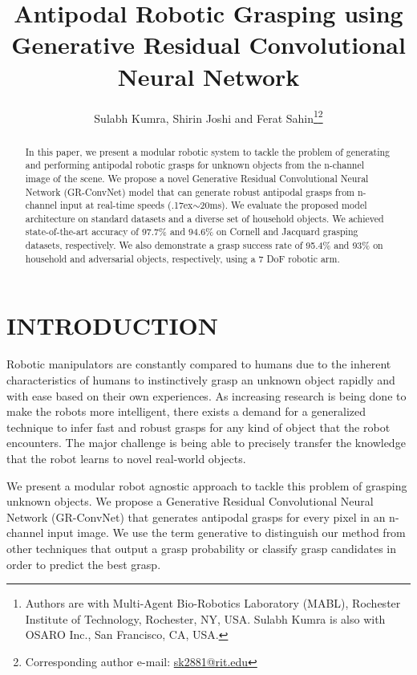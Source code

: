 \documentclass[letterpaper, 10pt, conference]{IEEEtran}
\begin{document}
\title{\LARGE \bf
Antipodal Robotic Grasping using \\ Generative Residual Convolutional Neural Network
}

\author{Sulabh Kumra, Shirin Joshi and Ferat Sahin\thanks{Authors are with Multi-Agent Bio-Robotics Laboratory (MABL), Rochester Institute of Technology, Rochester, NY, USA. Sulabh Kumra is also with OSARO Inc., San Francisco, CA, USA.}\thanks{Corresponding author e-mail: \href{mailto:sk2881@rit.edu}{sk2881@rit.edu}}
}

\maketitle



\begin{abstract}
In this paper, we present a modular robotic system to tackle the problem of generating and performing antipodal robotic grasps for unknown objects from the n-channel image of the scene. We propose a novel Generative Residual Convolutional Neural Network (GR-ConvNet) model that can generate robust antipodal grasps from n-channel input at real-time speeds ({\raise.17ex\hbox{$\scriptstyle\sim$}}20ms). We evaluate the proposed model architecture on standard datasets and a diverse set of household objects. We achieved state-of-the-art accuracy of 97.7\% and 94.6\% on Cornell and Jacquard grasping datasets, respectively. We also demonstrate a grasp success rate of 95.4\% and 93\% on household and adversarial objects, respectively, using a 7 DoF robotic arm.
\end{abstract}



\section{INTRODUCTION}
Robotic manipulators are constantly compared to humans due to the inherent characteristics of humans to instinctively grasp an unknown object rapidly and with ease based on their own experiences. As increasing research is being done to make the robots more intelligent, there exists a demand for a generalized technique to infer fast and robust grasps for any kind of object that the robot encounters. The major challenge is being able to precisely transfer the knowledge that the robot learns to novel real-world objects.

We present a modular robot agnostic approach to tackle this problem of grasping unknown objects. We propose a Generative Residual Convolutional Neural Network (GR-ConvNet) that generates antipodal grasps for every pixel in an n-channel input image. We use the term generative to distinguish our method from other techniques that output a grasp probability or classify grasp candidates in order to predict the best grasp.
\end{document}
